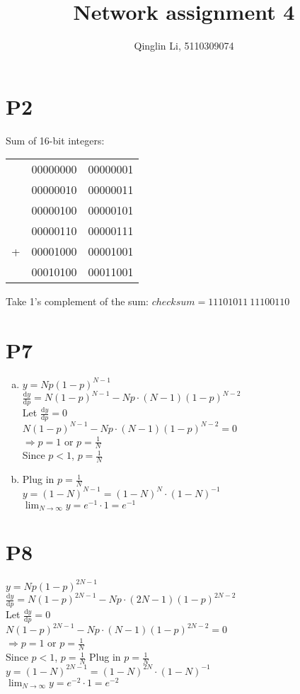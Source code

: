 \documentclass[12pt]{article}
\date{}
\title{Network assignment 4}
\author{Qinglin Li, 5110309074}
\begin{document}
\maketitle
\section*{P2}
Sum of 16-bit integers:\\

\begin{tabular}{ccc}
  & 00000000 & 00000001\\ 
  & 00000010 & 00000011\\ 
  & 00000100 & 00000101\\ 
  & 00000110 & 00000111\\ 
+ & 00001000 & 00001001\\ 
\hline
  & 00010100 & 00011001
\end{tabular} 

Take 1's complement of the sum: $checksum = 11101011~11100110$

\section*{P7}
\begin{enumerate}[(a)]
\item
$y=Np(1-p)^{N-1}$\\
$\frac{\mathrm{d}y}{\mathrm{d}p}=N(1-p)^{N-1} - Np\cdot(N-1)(1-p)^{N-2}$\\
Let $\frac{\mathrm{d}y}{\mathrm{d}p}=0$\\
$N(1-p)^{N-1} - Np\cdot(N-1)(1-p)^{N-2}=0$\\
$\Longrightarrow p = 1$ or $p=\frac{1}{N}$\\
Since $p<1$, $p = \frac{1}{N}$
\item 
Plug in $p=\frac{1}{N}$\\
$y=(1-N)^{N-1}=(1-N)^N\cdot (1-N)^{-1}$\\
$\lim_{N\to \infty} y= e^{-1}\cdot 1 = e^{-1}$
\end{enumerate}

\section*{P8}
$y=Np(1-p)^{2N-1}$\\
$\frac{\mathrm{d}y}{\mathrm{d}p}=N(1-p)^{2N-1} - Np\cdot(2N-1)(1-p)^{2N-2}$\\
Let $\frac{\mathrm{d}y}{\mathrm{d}p}=0$\\
$N(1-p)^{2N-1} - Np\cdot(N-1)(1-p)^{2N-2}=0$\\
$\Longrightarrow p = 1$ or $p=\frac{1}{N}$\\
Since $p<1$, $p = \frac{1}{N}$ 
Plug in $p=\frac{1}{N}$\\
$y=(1-N)^{2N-1}=(1-N)^{2N}\cdot (1-N)^{-1}$\\
$\lim_{N\to \infty} y= e^{-2}\cdot 1 = e^{-2}$
\end{document}
